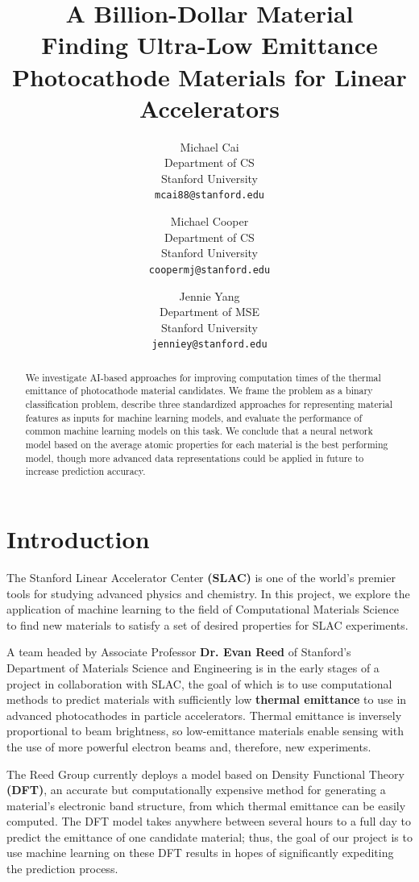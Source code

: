 \documentclass[10pt,twocolumn,letterpaper]{article}
\title{A Billion-Dollar Material \\
\large Finding Ultra-Low Emittance Photocathode Materials for Linear Accelerators}
\author{
Michael Cai\\
Department of CS\\
Stanford University\\
{\tt\small mcai88@stanford.edu}
\and
Michael Cooper\\
Department of CS\\
Stanford University\\
{\tt\small coopermj@stanford.edu}
\and
Jennie Yang\\
Department of MSE\\
Stanford University\\
{\tt\small jenniey@stanford.edu}
}
\begin{document}

\thispagestyle{empty}

\begin{abstract}
We investigate AI-based approaches for improving computation times of the thermal emittance of photocathode material candidates. We frame the problem as a binary classification problem, describe three standardized approaches for representing material features as inputs for machine learning models, and evaluate the performance of common machine learning models on this task. We conclude that a neural network model based on the average atomic properties for each material is the best performing model, though more advanced data representations could be applied in future to increase prediction accuracy.
\end{abstract}

\section{Introduction}

The Stanford Linear Accelerator Center \textbf{(SLAC)} is one of the world's premier tools for studying advanced physics and chemistry. In this project, we explore the application of machine learning to the field of Computational Materials Science to find new materials to satisfy a set of desired properties for SLAC experiments.

A team headed by Associate Professor \textbf{Dr. Evan Reed} of Stanford's Department of Materials Science and Engineering is in the early stages of a project in collaboration with SLAC, the goal of which is to use computational methods to predict materials with sufficiently low \textbf{thermal emittance} to use in advanced photocathodes in particle accelerators. Thermal emittance is inversely proportional to beam brightness, so low-emittance materials enable sensing with the use of more powerful electron beams and, therefore, new experiments.

The Reed Group currently deploys a model based on Density Functional Theory \textbf{(DFT)}, an accurate but computationally expensive method for generating a material's electronic band structure, from which thermal emittance can be easily computed. The DFT model takes anywhere between several hours to a full day to predict the emittance of one candidate material; thus, the goal of our project is to use machine learning on these DFT results in hopes of significantly expediting the prediction process.
\end{document}
